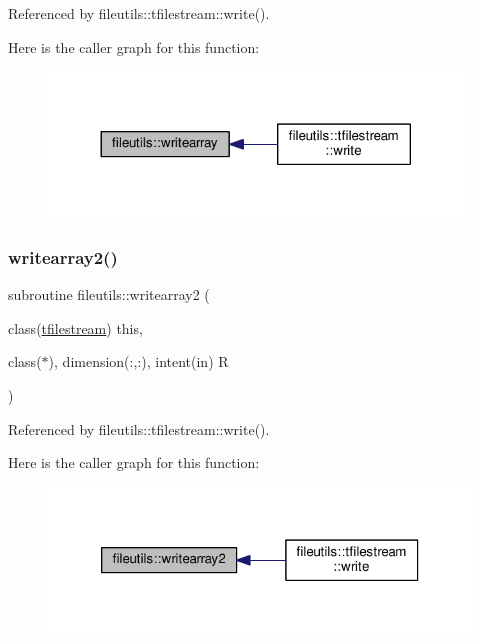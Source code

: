 Referenced by fileutils\+::tfilestream\+::write().

Here is the caller graph for this function\+:
\nopagebreak
\begin{figure}[H]
\begin{center}
\leavevmode
\includegraphics[width=312pt]{namespacefileutils_af7dad8ef48af586cc127b552cadeb999_icgraph}
\end{center}
\end{figure}
\mbox{\label{namespacefileutils_aa3569bb8cce3d65a6a7e820571bba597}} 
\subsubsection{\texorpdfstring{writearray2()}{writearray2()}}
{\footnotesize\ttfamily subroutine fileutils\+::writearray2 (\begin{DoxyParamCaption}\item[{class(\mbox{\hyperlink{structfileutils_1_1tfilestream}{tfilestream}})}]{this,  }\item[{class($\ast$), dimension(\+:,\+:), intent(in)}]{R }\end{DoxyParamCaption})\hspace{0.3cm}{\ttfamily [private]}}



Referenced by fileutils\+::tfilestream\+::write().

Here is the caller graph for this function\+:
\nopagebreak
\begin{figure}[H]
\begin{center}
\leavevmode
\includegraphics[width=318pt]{namespacefileutils_aa3569bb8cce3d65a6a7e820571bba597_icgraph}
\end{center}
\end{figure}
\mbox{\label{namespacefileutils_a35a5634d3290863e76dddffcf9ac63e2}} 
